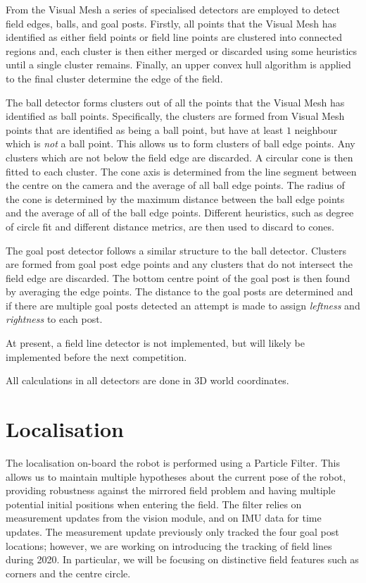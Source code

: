 \documentclass{llncs}
\begin{document}
From the Visual Mesh a series of specialised detectors are employed to detect field edges, balls, and goal posts. Firstly, all points that the Visual Mesh has identified as either field points or field line points are clustered into connected regions and, each cluster is then either merged or discarded using some heuristics until a single cluster remains. Finally, an upper convex hull algorithm is applied to the final cluster determine the edge of the field.

The ball detector forms clusters out of all the points that the Visual Mesh has identified as ball points. Specifically, the clusters are formed from Visual Mesh points that are identified as being a ball point, but have at least $1$ neighbour which is \emph{not} a ball point. This allows us to form clusters of ball edge points. Any clusters which are not below the field edge are discarded. A circular cone is then fitted to each cluster. The cone axis is determined from the line segment between the centre on the camera and the average of all ball edge points. The radius of the cone is determined by the maximum distance between the ball edge points and the average of all of the ball edge points. Different heuristics, such as degree of circle fit and different distance metrics, are then used to discard to cones.

The goal post detector follows a similar structure to the ball detector. Clusters are formed from goal post edge points and any clusters that do not intersect the field edge are discarded. The bottom centre point of the goal post is then found by averaging the edge points. The distance to the goal posts are determined and if there are multiple goal posts detected an attempt is made to assign \emph{leftness} and \emph{rightness} to each post.

At present, a field line detector is not implemented, but will likely be implemented before the next competition.

All calculations in all detectors are done in 3D world coordinates.

\section{Localisation}


The localisation on-board the robot is performed using a Particle Filter. This allows us to maintain multiple hypotheses about the current pose of the robot, providing robustness against the mirrored field problem and having multiple potential initial positions when entering the field. The filter relies on measurement updates from the vision module, and on IMU data for time updates. The measurement update previously only tracked the four goal post locations; however, we are working on introducing the tracking of field lines during 2020. In particular, we will be focusing on distinctive field features such as corners and the centre circle.
\end{document}
